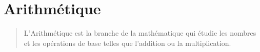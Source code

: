 \part{Arithmétique}

\vspace{5em}

\begin{quote}
    L'Arithmétique est la branche de la mathématique qui étudie les nombres et les opérations de base telles que l'addition ou la multiplication.
\end{quote}

\clearpage